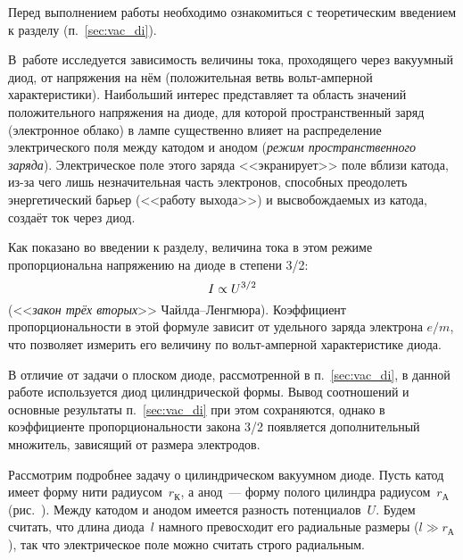 


Перед выполнением работы необходимо ознакомиться с теоретическим введением
к разделу (п.~\ref{sec:vac_di}).

В~работе исследуется зависимость величины тока, проходящего через вакуумный диод,
от напряжения на нём (положительная ветвь вольт-амперной характеристики).
Наибольший интерес представляет та область значений положительного напряжения
на диоде, для которой пространственный заряд (электронное облако) в лампе 
существенно влияет на распределение электрического поля между катодом и анодом
(\emph{режим пространственного заряда}). Электрическое поле этого заряда
<<экранирует>> поле вблизи катода, из-за чего лишь незначительная часть электронов, 
способных преодолеть энергетический барьер (<<работу выхода>>) и высвобождаемых 
из катода, создаёт ток через диод.


Как показано во введении к разделу, величина 
тока в этом режиме пропорциональна напряжению на диоде в степени 3/2:
\begin{equation}
\eqmark{IU}
	I\propto U^{3/2}
\end{equation}
(<<\emph{закон трёх вторых}>> Чайлда--Ленгмюра). 
Коэффициент пропорциональности в этой формуле зависит
от удельного заряда электрона $e/m$, что позволяет измерить его величину
по вольт-амперной характеристике диода.

В отличие от задачи о плоском диоде, рассмотренной в п.~\ref{sec:vac_di},
в данной работе используется диод цилиндрической формы.
Вывод соотношений и основные результаты п.~\ref{sec:vac_di} при этом 
сохраняются, 
однако в коэффициенте пропорциональности закона 3/2 появляется
дополнительный множитель, зависящий от размера электродов.


Рассмотрим подробнее задачу о цилиндрическом вакуумном диоде.
Пусть катод имеет форму нити радиусом~$r_{К}$, а анод~--- форму полого 
цилиндра радиусом~$r_{А}$ (рис.~). 
Между катодом и анодом имеется разность потенциалов~$U$.
Будем считать, что длина диода~$l$ намного превосходит его радиальные
размеры ($l\gg r_{А}$), так что электрическое поле можно 
считать строго радиальным.

